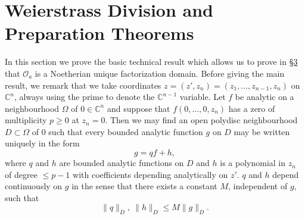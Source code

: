 \section{Weierstrass Division and Preparation Theorems}\label{sec:3:2}
In this section we prove the basic technical result which allows us to prove in \hyperref[sec:3:3]{\S3} that $\mathcal O_a$ is a Noetherian unique factorization domain. Before giving the main result, we remark that we take coordinates $z=(z',z_n)=(z_1,\ldots,z_{n-1},z_n)$ on $\mathbb C^n$, always using the prime to denote the $\mathbb C^{n-1}$ variable.
Let $f$ be analytic on a neighbourhood $\Omega$ of $0\in\mathbb C^n$ and suppose that $f(0,\ldots,0,z_n)$ has a zero of multiplicity $p\geq0$ at $z_n=0$. Then we may find an open polydisc neighbourhood $D\subset\Omega$ of $0$ such that every bounded analytic function $g$ on $D$ may be written uniquely in the form
\[g=qf+h,\]
where $q$ and $h$ are bounded analytic functions on $D$ and $h$ is a polynomial in $z_n$ of degree $\leq p-1$ with coefficients depending analytically on $z'$. $q$ and $h$ depend continuously on $g$ in the sense that there exists a constant $M$, independent of $g$, such that
\[\|q\|_D,\ \|h\|_D\leq M\|g\|_D.\]
